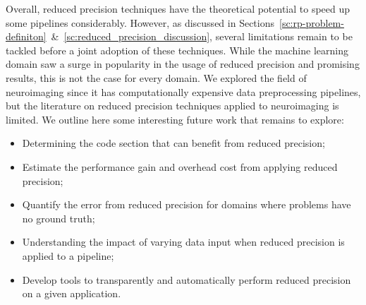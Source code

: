 Overall, reduced precision techniques have the theoretical potential to speed up
some pipelines considerably.
However, as discussed in Sections~\ref{sc:rp-problem-definiton}~\&~\ref{sc:reduced_precision_discussion},
several limitations remain to be tackled before a joint adoption of these techniques.
While the machine learning domain saw a surge in popularity in the usage of reduced
precision and promising results, this is not the case for every domain.
We explored the field of neuroimaging since it has computationally expensive
data preprocessing pipelines, but the literature on reduced precision techniques
applied to neuroimaging is limited.
We outline here some interesting future work that remains to explore:
\begin{itemize}
	\item Determining the code section that can benefit from reduced precision;
	\item Estimate the performance gain and overhead cost from applying reduced precision;
	\item Quantify the error from reduced precision for domains where problems have no ground truth;
	\item Understanding the impact of varying data input when reduced precision is applied to a pipeline;
	\item Develop tools to transparently and automatically perform reduced precision on a given application.
\end{itemize}
